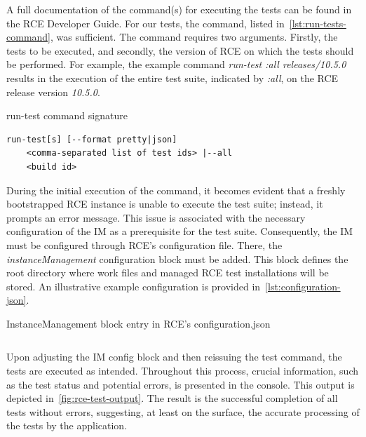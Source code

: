 A full documentation of the command(s) for executing the tests can be found in the \ac{RCE} Developer Guide. For our tests, the command, listed in~\cref{lst:run-tests-command}, was sufficient. The command requires two arguments. Firstly, the tests to be executed, and secondly, the version of \ac{RCE} on which the tests should be performed. For example, the example command \textit{run-test :all releases/10.5.0} results in the execution of the entire test suite, indicated by \textit{:all}, on the \ac{RCE} release version \textit{10.5.0}.

\begin{listing}[ht]
\caption{run-test command signature}
\label{lst:run-tests-command}
\begin{verbatim}
run-test[s] [--format pretty|json] 
    <comma-separated list of test ids> |--all
    <build id>
\end{verbatim}
\end{listing}


During the initial execution of the command, it becomes evident that a freshly bootstrapped \ac{RCE} instance is unable to execute the test suite; instead, it prompts an error message. This issue is associated with the necessary configuration of the \ac{IM} as a prerequisite for the test suite. Consequently, the \ac{IM} must be configured through \ac{RCE}'s configuration file. There, the \textit{instanceManagement} configuration block must be added. This block defines the root directory where work files and managed RCE test installations will be stored. An illustrative example configuration is provided in~\cref{lst:configuration-json}.

\begin{listing}
\caption{InstanceManagement block entry in \ac{RCE}'s configuration.json}
\label{lst:configuration-json}
\inputminted{json}{files/code/configuration.json}
\end{listing}

Upon adjusting the \ac{IM} config block and then reissuing the test command, the tests are executed as intended. Throughout this process, crucial information, such as the test status and potential errors, is presented in the console. This output is depicted in~\cref{fig:rce-test-output}. The result is the successful completion of all tests without errors, suggesting, at least on the surface, the accurate processing of the tests by the application.

